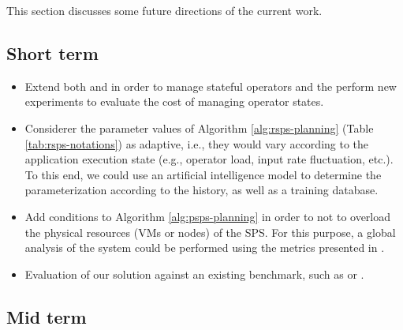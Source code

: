 This section discusses some future directions of the current work.

\subsection{Short term}

\begin{itemize}
\item Extend both \rSPS{} and \pSPS{} in order to manage stateful operators and the perform new experiments to evaluate the cost of managing operator states.

\item Considerer the parameter values of Algorithm \ref{alg:rsps-planning} (Table \ref{tab:rsps-notations}) as adaptive, i.e., they would vary according to the application execution state (e.g., operator load,  input rate fluctuation, etc.). To this end, we could use an artificial intelligence model to determine the parameterization according to the history, as well as a training database.

\item Add conditions to Algorithm \ref{alg:psps-planning} in order to not to overload the physical resources (VMs or nodes) of the SPS. For this purpose, a global analysis of the system could be performed using the metrics presented in \rSPS{}.

\item Evaluation of our solution against an existing benchmark, such as \cite{ShuklaCS17} or \cite{ArasuCGMMRST04}.

\end{itemize}

\subsection{Mid term}

